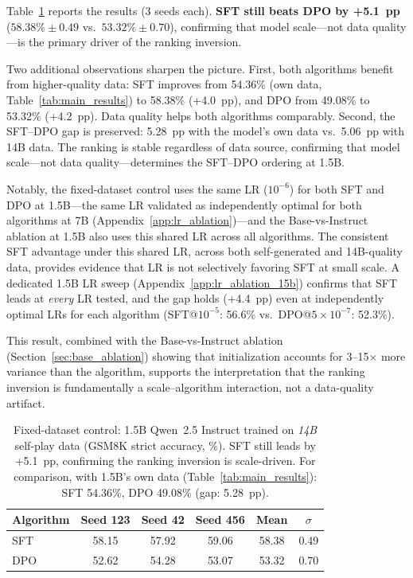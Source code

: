 \documentclass{article}
\begin{document}
Table~\ref{tab:fixed_dataset} reports the results (3 seeds each). \textbf{SFT still beats DPO by +5.1~pp} ($58.38\% \pm 0.49$ vs.\ $53.32\% \pm 0.70$), confirming that model scale---not data quality---is the primary driver of the ranking inversion.

Two additional observations sharpen the picture. First, both algorithms benefit from higher-quality data: SFT improves from 54.36\% (own data, Table~\ref{tab:main_results}) to 58.38\% (+4.0~pp), and DPO from 49.08\% to 53.32\% (+4.2~pp). Data quality helps both algorithms comparably. Second, the SFT--DPO gap is preserved: 5.28~pp with the model's own data vs.\ 5.06~pp with 14B data. The ranking is stable regardless of data source, confirming that model scale---not data quality---determines the SFT--DPO ordering at 1.5B.

Notably, the fixed-dataset control uses the same LR ($10^{-6}$) for both SFT and DPO at 1.5B---the same LR validated as independently optimal for both algorithms at 7B (Appendix~\ref{app:lr_ablation})---and the Base-vs-Instruct ablation at 1.5B also uses this shared LR across all algorithms. The consistent SFT advantage under this shared LR, across both self-generated and 14B-quality data, provides evidence that LR is not selectively favoring SFT at small scale. A dedicated 1.5B LR sweep (Appendix~\ref{app:lr_ablation_15b}) confirms that SFT leads at \emph{every} LR tested, and the gap holds (+4.4~pp) even at independently optimal LRs for each algorithm (SFT@$10^{-5}$: 56.6\% vs.\ DPO@$5{\times}10^{-7}$: 52.3\%).

This result, combined with the Base-vs-Instruct ablation (Section~\ref{sec:base_ablation}) showing that initialization accounts for 3--15$\times$ more variance than the algorithm, supports the interpretation that the ranking inversion is fundamentally a scale--algorithm interaction, not a data-quality artifact.

\begin{table}[h]
\centering
\caption{Fixed-dataset control: 1.5B Qwen~2.5 Instruct trained on \emph{14B} self-play data (GSM8K strict accuracy, \%). SFT still leads by +5.1~pp, confirming the ranking inversion is scale-driven. For comparison, with 1.5B's own data (Table~\ref{tab:main_results}): SFT 54.36\%, DPO 49.08\% (gap: 5.28~pp).}
\begin{tabular}{lccccc}
\toprule
Algorithm & Seed 123 & Seed 42 & Seed 456 & Mean & $\sigma$ \\
\midrule
SFT & 58.15 & 57.92 & 59.06 & 58.38 & 0.49 \\
DPO & 52.62 & 54.28 & 53.07 & 53.32 & 0.70 \\
\bottomrule
\end{tabular}
\label{tab:fixed_dataset}
\end{table}
\end{document}
